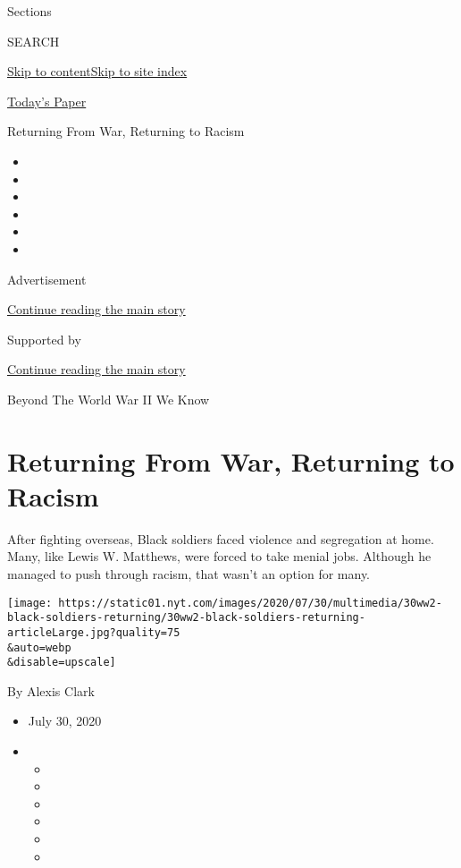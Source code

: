 Sections

SEARCH

\protect\hyperlink{site-content}{Skip to
content}\protect\hyperlink{site-index}{Skip to site index}

\href{https://myaccount.nytimes.com/auth/login?response_type=cookie\&client_id=vi}{}

\href{https://www.nytimes.com/section/todayspaper}{Today's Paper}

Returning From War, Returning to Racism

\begin{itemize}
\item
\item
\item
\item
\item
\item
\end{itemize}

Advertisement

\protect\hyperlink{after-top}{Continue reading the main story}

Supported by

\protect\hyperlink{after-sponsor}{Continue reading the main story}

Beyond The World War II We Know

\hypertarget{returning-from-war-returning-to-racism}{%
\section{Returning From War, Returning to
Racism}\label{returning-from-war-returning-to-racism}}

After fighting overseas, Black soldiers faced violence and segregation
at home. Many, like Lewis W. Matthews, were forced to take menial jobs.
Although he managed to push through racism, that wasn't an option for
many.

\texttt{[image: https://static01.nyt.com/images/2020/07/30/multimedia/30ww2-black-soldiers-returning/30ww2-black-soldiers-returning-articleLarge.jpg?quality=75\\\&auto=webp\\\&disable=upscale]}

By Alexis Clark

\begin{itemize}
\item
  July 30, 2020
\item
  \begin{itemize}
  \item
  \item
  \item
  \item
  \item
  \item
  \end{itemize}
\end{itemize}

